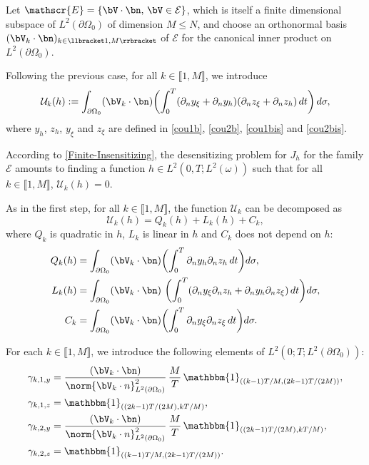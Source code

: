 Let $\mathscr{E} = \{ \bV\cdot \bn,\, \bV \in \mathcal{E}\}$, which is itself a finite dimensional subspace of $L^2(\partial\Omega_0)$ of dimension $M\leqslant N$, and choose an orthonormal basis $(\bV_k\cdot \bn)_{k \in \llbracket 1, M\rrbracket}$ of $\mathscr{E}$ for the canonical inner product on $L^2(\partial\Omega_0)$.

Following the previous case, for all $k \in \llbracket 1,M \rrbracket $, we introduce
\begin{equation}
\label{argenton2}
\mathcal{U}_k(h):=
\int_{\partial\Omega_{0}}(\bV_k\cdot \bn)
\biggl(\int_{0}^{T}(\partial_{n} y_{\xi} + \partial_n y_h) (\partial_{n} z_{\xi} + \partial_n z_h)\, dt \biggr)
\, d\sigma,
\end{equation}
where $y_{h}$, $z_{h}$, $ y_{\xi}$ and $z_{\xi}$ are defined in \eqref{cou1b}, \eqref{cou2b}, \eqref{cou1bis} and \eqref{cou2bis}.

According to \eqref{Finite-Insensitizing}, the desensitizing problem for $J_h$ for the family $\mathcal{E}$ amounts to finding {a function} $h \in L^2(0,T; L^2(\omega))$ such that for all $k \in \llbracket 1,M \rrbracket $, $\mathcal{U}_k(h) = 0$.

As in the first step, for all $k \in \llbracket 1,M \rrbracket $, the function $\mathcal{U}_k$ can be decomposed as
\begin{equation}
\label{Decomposition-U-k}
\mathcal{U}_k(h)=Q_k(h)+L_k(h)+C_k,
\end{equation}
where $Q_k$ is quadratic in $h$, $L_k$ is linear in $h$ and $C_k$ does not depend on $h$:
\begin{align}
\label{Def-Q-k}
Q_k(h)&= \int_{\partial \Omega_0} (\bV_k\cdot \bn)
\biggl(\int_0^T \partial_{n} y_{h}\partial_{n} z_{h}\, dt\biggr) d\sigma,
\\
\label{Def-L-k}
L_k(h)&= \int_{\partial \Omega_0}(\bV_k\cdot \bn) \
\biggl(\int_0^T (\partial_{n} y_{\xi}\partial_{n} z_{h}+\partial_{n} y_{h}\partial_{n} z_{\xi})\, dt \biggr)d\sigma,
\\
\label{Def-C-k}
C_k&= \int_{\partial \Omega_0} (\bV_k\cdot \bn)
\biggl(\int_0^T \partial_{n} y_{\xi}\partial_{n} z_{\xi}\, dt \biggr)
d\sigma.
\end{align}

For each $k \in \llbracket 1,M \rrbracket $, we introduce the following elements of $L^2(0;T; L^2(\partial \Omega_0))$:
\begin{align*}
\gamma_{k,1,y} &= \frac{(\bV_k \cdot \bn)}{\norm{\bV_k\cdot n}_{L^2(\partial\Omega_0)}^2}\,\frac{M }{T}\, \mathbbm{1}_{((k-1)T/M,(2k-1)T/(2M))},\\
 \gamma_{k,1,z} &= \mathbbm{1}_{((2k-1)T/(2M), kT/M)},\\
\gamma_{k,2, y} &= \frac{(\bV_k \cdot \bn)}{\norm{\bV_k\cdot n}_{L^2(\partial\Omega_0)}^2}\,\frac{M}{T}\,\mathbbm{1}_{((2k-1)T/(2M), kT/M)},\\
\gamma_{k,2, z} &= \mathbbm{1}_{((k-1)T/M,(2k-1)T/(2M))}.
\end{align*}

